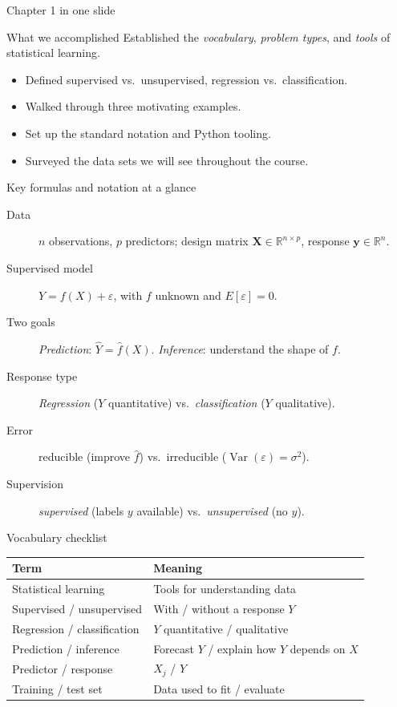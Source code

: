 \documentclass[aspectratio=169,11pt]{beamer}
\begin{document}
\begin{frame}{Chapter 1 in one slide}
  \begin{block}{What we accomplished}
    Established the \emph{vocabulary}, \emph{problem types}, and
    \emph{tools} of statistical learning.
  \end{block}
  \begin{itemize}
    \item Defined supervised vs.\ unsupervised, regression vs.\
          classification.
    \item Walked through three motivating examples.
    \item Set up the standard notation and Python tooling.
    \item Surveyed the data sets we will see throughout the course.
  \end{itemize}
\end{frame}

\begin{frame}{Key formulas and notation at a glance}
  \footnotesize
  \begin{description}
    \item[Data] $n$ observations, $p$ predictors; design matrix $\mathbf{X}\in\mathbb{R}^{n\times p}$, response $\mathbf{y}\in\mathbb{R}^n$.
    \item[Supervised model] $Y=f(X)+\varepsilon$, with $f$ unknown and $E[\varepsilon]=0$.
    \item[Two goals] \emph{Prediction}: $\hat Y=\hat f(X)$. \quad \emph{Inference}: understand the shape of $f$.
    \item[Response type] \emph{Regression} ($Y$ quantitative) vs.\ \emph{classification} ($Y$ qualitative).
    \item[Error] reducible (improve $\hat f$) vs.\ irreducible ($\operatorname{Var}(\varepsilon)=\sigma^2$).
    \item[Supervision] \emph{supervised} (labels $y$ available) vs.\ \emph{unsupervised} (no $y$).
  \end{description}
\end{frame}

\begin{frame}{Vocabulary checklist}
  \footnotesize
  \begin{tabular}{ll}
    \toprule
    \textbf{Term} & \textbf{Meaning} \\
    \midrule
    Statistical learning & Tools for understanding data \\
    Supervised / unsupervised & With / without a response $Y$ \\
    Regression / classification & $Y$ quantitative / qualitative \\
    Prediction / inference & Forecast $Y$ / explain how $Y$ depends on $X$ \\
    Predictor / response & $X_j$ / $Y$ \\
    Training / test set & Data used to fit / evaluate \\
    \bottomrule
  \end{tabular}
\end{frame}
\end{document}
